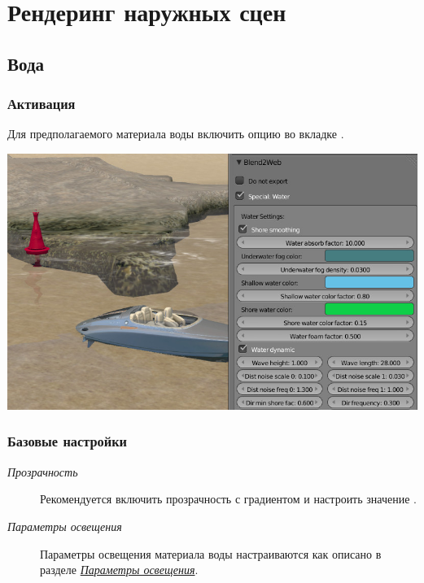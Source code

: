 \documentclass[a4paper,12pt,oneside]{sphinxmanual}
\begin{document}
\chapter{Рендеринг наружных сцен}
\label{outdoor_rendering:outdoor-rendering}\label{outdoor_rendering::doc}\label{outdoor_rendering:id1}

\section{Вода}
\label{outdoor_rendering:id2}

\subsection{Активация}
\label{outdoor_rendering:id3}
Для предполагаемого материала воды включить опцию  во вкладке .

{\hfill\includegraphics[width=1.000\linewidth]{water_material_setup.jpg}\hfill}


\subsection{Базовые настройки}
\label{outdoor_rendering:id4}\begin{description}
\item[{\emph{Прозрачность}}] \leavevmode
Рекомендуется включить прозрачность с градиентом  и настроить значение .

\item[{\emph{Параметры освещения}}] \leavevmode
Параметры освещения материала воды настраиваются как описано в разделе {\hyperref[materials:material-lighting-params]{\emph{Параметры освещения}}}.

\end{description}
\end{document}
